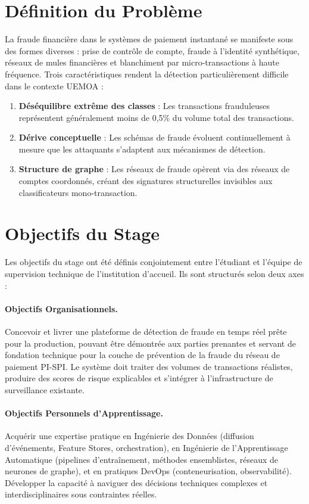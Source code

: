 \documentclass[12pt,a4paper,oneside]{book}
\theoremstyle{definition}
\theoremstyle{plain}
\begin{document}
\section{Définition du Problème}

La fraude financière dans le systèmes de paiement instantané se manifeste sous des formes diverses : prise de contrôle de compte, fraude à l'identité synthétique, réseaux de mules financières et blanchiment par micro-transactions à haute fréquence. Trois caractéristiques rendent la détection particulièrement difficile dans le contexte UEMOA :

\begin{enumerate}[label=\roman*.]
  \item \textbf{Déséquilibre extrême des classes} : Les transactions frauduleuses représentent généralement moins de 0,5\% du volume total des transactions.
  \item \textbf{Dérive conceptuelle} : Les schémas de fraude évoluent continuellement à mesure que les attaquants s'adaptent aux mécanismes de détection.
  \item \textbf{Structure de graphe} : Les réseaux de fraude opèrent via des réseaux de comptes coordonnés, créant des signatures structurelles invisibles aux classificateurs mono-transaction.
\end{enumerate}

\section{Objectifs du Stage}

Les objectifs du stage ont été définis conjointement entre l'étudiant et l'équipe de supervision technique de l'institution d'accueil. Ils sont structurés selon deux axes :

\paragraph{Objectifs Organisationnels.}
Concevoir et livrer une plateforme de détection de fraude en temps réel prête pour la production, pouvant être démontrée aux parties prenantes et servant de fondation technique pour la couche de prévention de la fraude du réseau de paiement PI-SPI. Le système doit traiter des volumes de transactions réalistes, produire des scores de risque explicables et s'intégrer à l'infrastructure de surveillance existante.

\paragraph{Objectifs Personnels d'Apprentissage.}
Acquérir une expertise pratique en Ingénierie des Données (diffusion d'événements, Feature Stores, orchestration), en Ingénierie de l'Apprentissage Automatique (pipelines d'entraînement, méthodes ensemblistes, réseaux de neurones de graphe), et en pratiques DevOps (conteneurisation, observabilité). Développer la capacité à naviguer des décisions techniques complexes et interdisciplinaires sous contraintes réelles.
\end{document}
